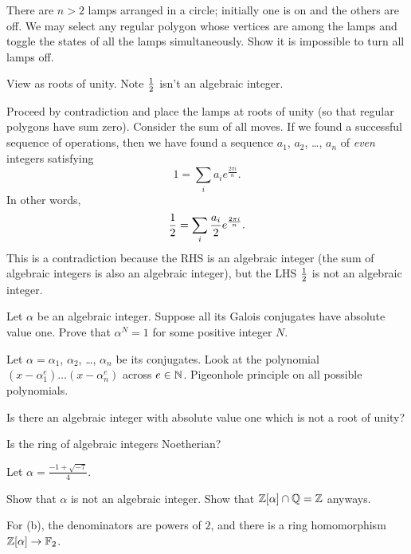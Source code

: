 \begin{problem}
	[MOP 2010]
	There are $n > 2$ lamps arranged in a circle;
	initially one is on and the others are off.
	We may select any regular polygon whose vertices are among the lamps
	and toggle the states of all the lamps simultaneously.
	Show it is impossible to turn all lamps off.
	\begin{hint}
		View as roots of unity. Note $\frac{1}{2}$ isn't an algebraic integer.
	\end{hint}
	\begin{sol}
		Proceed by contradiction and place the lamps at roots of unity
		(so that regular polygons have sum zero).
		Consider the sum of all moves.
		If we found a successful sequence of operations,
		then we have found a sequence $a_1$, $a_2$, \dots, $a_n$ of \emph{even} integers satisfying
		\[ 1 = \sum_i a_i e^{\frac{2\pi i}{n}}. \]
		In other words,
		\[ \frac{1}{2} = \sum_i \frac{a_i}{2} e^{\frac{2\pi i}{n}}. \]
		This is a contradiction because the RHS is an algebraic integer
		(the sum of algebraic integers is also an algebraic integer),
		but the LHS $\frac{1}{2}$ is not an algebraic integer.
	\end{sol}
\end{problem}

\begin{problem}
	\twochili
	Let $\alpha$ be an algebraic integer.
	Suppose all its Galois conjugates have absolute value one.
	Prove that $\alpha^N=1$ for some positive integer $N$.
	\begin{hint}
		Let $\alpha = \alpha_1$, $\alpha_2$, \dots, $\alpha_n$ be its conjugates.
		Look at the polynomial $(x-\alpha_1^e) \dots (x-\alpha_n^e)$ across $e \in \mathbb N$.
		Pigeonhole principle on all possible polynomials.
	\end{hint}
\end{problem}

\begin{problem}
	\twochili
	Is there an algebraic integer with absolute value one
	which is not a root of unity?
\end{problem}

\begin{problem}
	Is the ring of algebraic integers Noetherian?
\end{problem}

\begin{problem}
	\label{prob:alg_int_conjugates}
	Let $\alpha = \frac{-1+\sqrt{-7}}{4}$.
	\begin{enumerate}[(a)]
		\ii Show that $\alpha$ is not an algebraic integer.
		\ii Show that $\mathbb Z[\alpha] \cap \mathbb Q = \mathbb Z$ anyways.
	\end{enumerate}
	\begin{hint}
		For (b), the denominators are powers of $2$,
		and there is a ring homomorphism $\mathbb Z[\alpha] \to \mathbb F_2$.
	\end{hint}
\end{problem}
